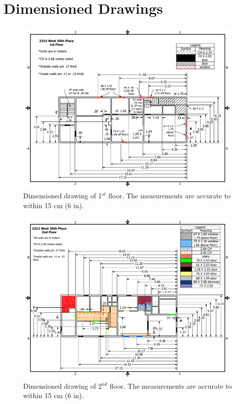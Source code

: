 \documentclass[11pt,oneside]{book}
\begin{document}


\appendix

\chapter{Dimensioned Drawings}

\begin{figure}[h!]
\centering
\includegraphics[width=1\textwidth]{../Figures/50th_Place_1st_Floor}
\caption {Dimensioned drawing of 1$^{st}$ floor. The measurements are accurate to within 15 cm (6 in).}
\label{fig:first_floor}
\end{figure}

\begin{figure}[h!]
\centering
\includegraphics[width=1\textwidth]{../Figures/50th_Place_2nd_Floor}
\caption {Dimensioned drawing of 2$^{nd}$ floor. The measurements are accurate to within 15 cm (6 in).}
\label{fig:second_floor}
\end{figure}
\end{document}
